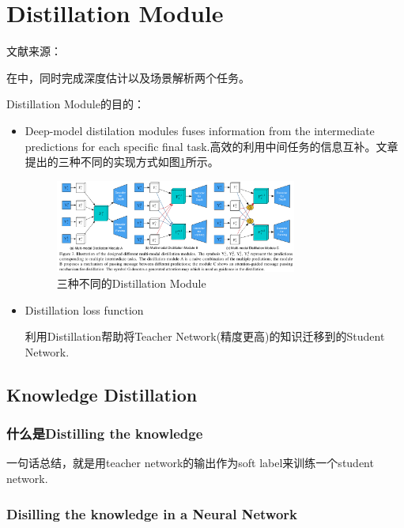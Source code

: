 \section{Distillation Module}
文献来源：\cite{Xu2018PADNet}\cite{Mehta2018OD200}

在\cite{Xu2018PADNet}中，同时完成深度估计以及场景解析两个任务。

Distillation Module的目的：
\begin{itemize}
\item Deep-model distilation modules fuses information from the intermediate predictions for each specific final task\cite{Xu2018PADNet}.高效的利用中间任务的信息互补。文章\cite{Xu2018PADNet}提出的三种不同的实现方式如图\ref{ThreeDistillationModules1}所示。

\begin{figure}[!hbtp]
\centering
\includegraphics[width=0.75\textwidth]{DLTips/ThreeDistillationModules1.png}
\caption{三种不同的Distillation Module}
\label{ThreeDistillationModules1}
\end{figure}

\item Distillation loss function\cite{Mehta2018OD200}

利用Distillation帮助将Teacher Network(精度更高)的知识迁移到的Student Network.

\end{itemize}

\subsection{Knowledge Distillation}

\subsubsection{什么是Distilling the knowledge}

一句话总结，就是用teacher network的输出作为soft label来训练一个student network.

\subsubsection{Disilling the knowledge in a Neural Network}

